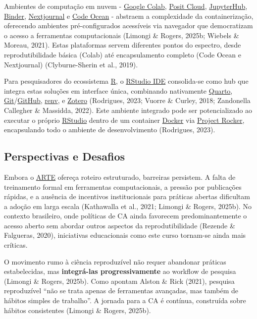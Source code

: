 \documentclass[
  a4paper,
]{book}
\begin{document}
Ambientes de computação em nuvem -
\href{https://colab.research.google.com/}{Google Colab},
\href{https://posit.cloud/}{Posit Cloud},
\href{https://jupyter.org/hub}{JupyterHub},
\href{https://mybinder.org/}{Binder},
\href{https://nextjournal.com/}{Nextjournal} e
\href{https://codeocean.com/}{Code Ocean} - abstraem a complexidade da
containerização, oferecendo ambientes pré-configurados acessíveis via
navegador que democratizam o acesso a ferramentas computacionais
(Limongi \& Rogers, 2025b; Wiebels \& Moreau, 2021). Estas plataformas
servem diferentes pontos do espectro, desde reprodutibilidade básica
(Colab) até encapsulamento completo (Code Ocean e Nextjournal)
(Clyburne-Sherin et al., 2019).

Para pesquisadores do ecossistema \href{https://cran.r-project.org/}{R},
o \href{https://posit.co/products/open-source/rstudio/}{RStudio IDE}
consolida-se como hub que integra estas soluções em interface única,
combinando nativamente \href{https://quarto.org/}{Quarto},
\href{https://git-scm.com/}{Git}/\href{https://github.com/}{GitHub},
\href{https://rstudio.github.io/renv/}{renv}, e
\href{https://www.zotero.org/}{Zotero} (Rodrigues, 2023; Vuorre \&
Curley, 2018; Zandonella Callegher \& Massidda, 2022). Este ambiente
integrado pode ser potencializado ao executar o próprio
\href{https://posit.co/products/open-source/rstudio/}{RStudio} dentro de
um container \href{https://www.docker.com/}{Docker} via
\href{https://rocker-project.org/}{Project Rocker}, encapsulando todo o
ambiente de desenvolvimento (Rodrigues, 2023).

\subsection{Perspectivas e Desafios}\label{perspectivas-e-desafios}

Embora o \href{https://phdpablo.github.io/article-template/}{ARTE}
ofereça roteiro estruturado, barreiras persistem. A falta de treinamento
formal em ferramentas computacionais, a pressão por publicações rápidas,
e a ausência de incentivos institucionais para práticas abertas
dificultam a adoção em larga escala (Kathawalla et al., 2021; Limongi \&
Rogers, 2025b). No contexto brasileiro, onde políticas de CA ainda
favorecem predominantemente o acesso aberto sem abordar outros aspectos
da reprodutibilidade (Rezende \& Falgueras, 2020), iniciativas
educacionais como este curso tornam-se ainda mais críticas.

O movimento rumo à ciência reproduzível não requer abandonar práticas
estabelecidas, mas \textbf{integrá-las progressivamente} ao workflow de
pesquisa (Limongi \& Rogers, 2025b). Como apontam Alston \& Rick (2021),
pesquisa reproduzível ``não se trata apenas de ferramentas avançadas,
mas também de hábitos simples de trabalho''. A jornada para a CA é
contínua, construída sobre hábitos consistentes (Limongi \& Rogers,
2025b).
\end{document}
